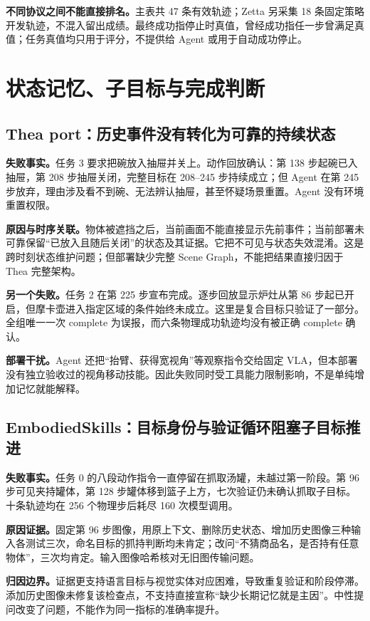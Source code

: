 \documentclass[UTF8,11pt,a4paper,fontset=none]{ctexart}
\begin{document}
\textbf{不同协议之间不能直接排名。}主表共 47 条有效轨迹；Zetta 另采集 18 条固定策略开发轨迹，不混入留出成绩。最终成功指停止时真值，曾经成功指任一步曾满足真值；任务真值均只用于评分，不提供给 Agent 或用于自动成功停止。

\clearpage\section{状态记忆、子目标与完成判断}

\subsection*{Thea port：历史事件没有转化为可靠的持续状态}
\textbf{失败事实。}任务 3 要求把碗放入抽屉并关上。动作回放确认：第 138 步起碗已入抽屉，第 208 步抽屉关闭，完整目标在 208--245 步持续成立；但 Agent 在第 245 步放弃，理由涉及看不到碗、无法辨认抽屉，甚至怀疑场景重置。Agent 没有环境重置权限。

\textbf{原因与时序关联。}物体被遮挡之后，当前画面不能直接显示先前事件；当前部署未可靠保留“已放入且随后关闭”的状态及其证据。它把不可见与状态失效混淆。这是跨时刻状态维护问题；但部署缺少完整 Scene Graph，不能把结果直接归因于 Thea 完整架构。

\textbf{另一个失败。}任务 2 在第 225 步宣布完成。逐步回放显示炉灶从第 86 步起已开启，但摩卡壶进入指定区域的条件始终未成立。这里是复合目标只验证了一部分。全组唯一一次 complete 为误报，而六条物理成功轨迹均没有被正确 complete 确认。

\textbf{部署干扰。}Agent 还把“抬臂、获得宽视角”等观察指令交给固定 VLA，但本部署没有独立验收过的视角移动技能。因此失败同时受工具能力限制影响，不是单纯增加记忆就能解释。

\subsection*{EmbodiedSkills：目标身份与验证循环阻塞子目标推进}
\textbf{失败事实。}任务 0 的八段动作指令一直停留在抓取汤罐，未越过第一阶段。第 96 步可见夹持罐体，第 128 步罐体移到篮子上方，七次验证仍未确认抓取子目标。十条轨迹均在 256 个物理步后耗尽 160 次模型调用。

\textbf{原因证据。}固定第 96 步图像，用原上下文、删除历史状态、增加历史图像三种输入各测试三次，命名目标的抓持判断均未肯定；改问“不猜商品名，是否持有任意物体”，三次均肯定。输入图像哈希核对无旧图传输问题。

\textbf{归因边界。}证据更支持语言目标与视觉实体对应困难，导致重复验证和阶段停滞。添加历史图像未修复该检查点，不支持直接宣称“缺少长期记忆就是主因”。中性提问改变了问题，不能作为同一指标的准确率提升。
\end{document}
